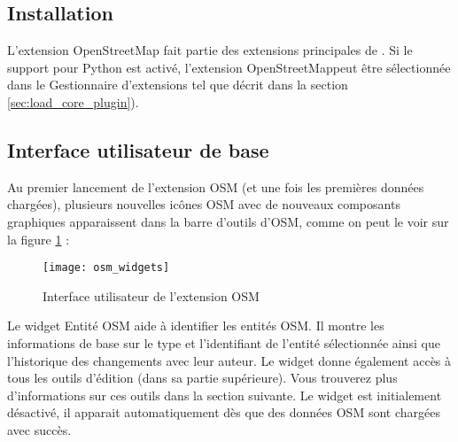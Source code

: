 \subsection{Installation}

L'extension OpenStreetMap fait partie des extensions principales de \qg. Si le support pour Python est activé, l'extension \og OpenStreetMap\fg peut être sélectionnée dans le Gestionnaire d'extensions tel que décrit dans la section \ref{sec:load_core_plugin}).

\subsection{Interface utilisateur de base}

Au premier lancement de l'extension OSM (et une fois les premières données chargées), plusieurs nouvelles icônes OSM avec de nouveaux composants graphiques apparaissent dans la barre d'outils d'OSM, comme on peut le voir sur la figure \ref{fig:osmwidget} :

\begin{figure}[ht]
\centering
   \texttt{[image: osm\_widgets]}
   \caption{Interface utilisateur de l'extension OSM \nixcaption}\label{fig:osmwidget}
\end{figure}


Le widget Entité OSM aide à identifier les entités OSM. Il montre les informations de base sur le type et l'identifiant de l'entité sélectionnée ainsi que l'historique des changements avec leur auteur. Le widget donne également accès à tous les outils d'édition (dans sa partie supérieure). Vous trouverez plus d'informations sur ces outils dans la section suivante. Le widget est initialement désactivé, il apparait automatiquement dès que des données OSM sont chargées avec succès.

